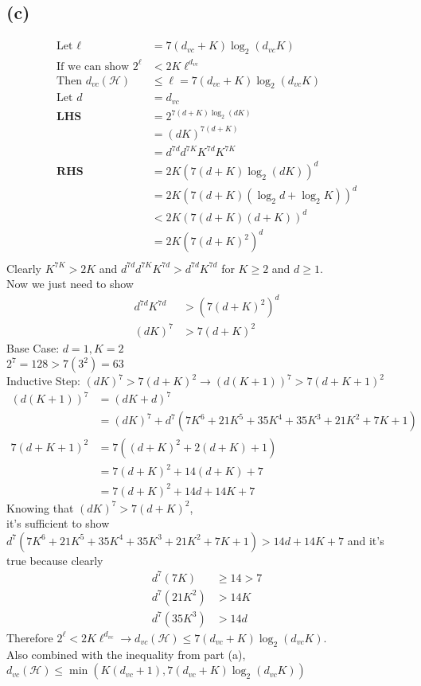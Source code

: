 \documentclass{article}
\begin{document}
	\subsection*{(c)}
		\begin{align*}
			\text{Let } \ell &= 7(d_{vc} + K)\log_2(d_{vc}K)\\
			\text{If we can show } 2^\ell &< 2K\ell^{d_{vc}}\\
			\text{Then } d_{vc}(\mathcal H) &\leq \ell = 7(d_{vc} + K)\log_2(d_{vc}K)\\
			\text{Let }d &= d_{vc}\\
			\textbf{LHS } &= 2^{ 7(d+K)\log_2(dK) }\\
			&= (dK)^{7(d+K)}\\
			&= d^{7d}d^{7K}K^{7d}K^{7K}\\
			\textbf{RHS } &= 2K(7(d+K)\log_2(dK))^d\\
			&= 2K(7(d+K)(\log_2d+\log_2K))^d\\
			&< 2K(7(d+K)(d+K))^d\\
			&= 2K(7(d+K)^2)^d\\
		\end{align*}
		Clearly $K^{7K} > 2K$ and $d^{7d}d^{7K}K^{7d} > d^{7d}K^{7d}$ for $K \geq 2$ and $d \geq 1$.\\
		Now we just need to show
		\begin{align*}
			d^{7d}K^{7d} &>(7(d+K)^2)^d\\
			(dK)^7 &> 7(d+K)^2
		\end{align*}
		Base Case: $d = 1, K = 2$\\
		$2^7 = 128 > 7(3^2) = 63$\\
		Inductive Step: $(dK)^7 > 7(d+K)^2 \rightarrow (d(K+1))^7 > 7(d+K+1)^2$
		\begin{align*}
			(d(K+1))^7 &= (dK+d)^7\\
			&= (dK)^7 + d^7(7K^6+21K^5+35K^4+35K^3+21K^2+7K+1)\\
			7(d+K+1)^2 &= 7((d+K)^2+2(d+K)+1)\\
			&= 7(d+K)^2 + 14(d+K) + 7\\
			&= 7(d+K)^2 + 14d+14K + 7
		\end{align*}
		Knowing that $(dK)^7 > 7(d+K)^2$,\\
		it's sufficient to show $d^7(7K^6+21K^5+35K^4+35K^3+21K^2+7K+1) > 14d+14K + 7$ and it's true because clearly
		\begin{align*}
			d^7(7K) &\geq 14 > 7\\
			d^7(21K^2) &> 14K\\
			d^7(35K^3) &> 14d
		\end{align*}
		Therefore $2^\ell < 2K\ell^{d_{vc}} \rightarrow d_{vc}(\mathcal H) \leq 7(d_{vc} + K)\log_2(d_{vc}K)$.\\
		Also combined with the inequality from part (a), $d_{vc}(\mathcal H) \leq \min( K(d_{vc}+1), 7(d_{vc} + K)\log_2(d_{vc}K) )$
\end{document}
